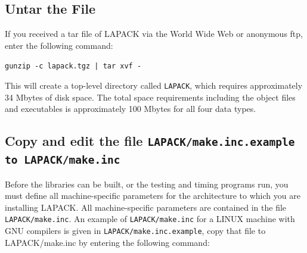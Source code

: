 \documentclass[11pt]{report}
\begin{document}
\begin{enumerate}
%
%
\end{enumerate}
 
\subsection{Untar the File}

If you received a tar file of LAPACK via the World Wide
Web or anonymous ftp, enter the following command:

\begin{list}{}
\item{\texttt{gunzip -c lapack.tgz | tar xvf -}}
\end{list}

\noindent
This will create a top-level directory called \texttt{LAPACK}, which
requires approximately 34 Mbytes of disk space.
The total space requirements including the object files and executables
is approximately 100 Mbytes for all four data types.

\subsection{Copy and edit the file \texttt{LAPACK/make.inc.example to LAPACK/make.inc}}

Before the libraries can be built, or the testing and timing programs
run, you must define all machine-specific parameters for the
architecture to which you are installing LAPACK.  All machine-specific
parameters are contained in the file \texttt{LAPACK/make.inc}.
An example of  \texttt{LAPACK/make.inc} for a LINUX machine with GNU compilers is given 
in \texttt{LAPACK/make.inc.example}, copy that file to LAPACK/make.inc by entering the following command:
\end{document}
